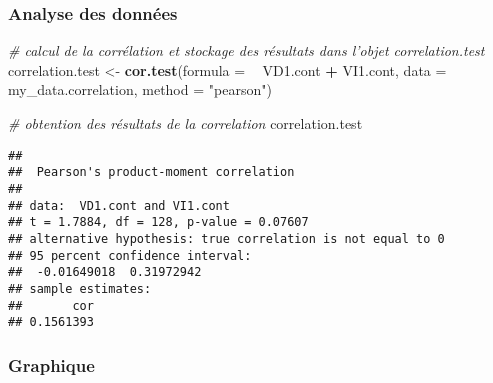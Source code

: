 \documentclass[
]{book}
\newenvironment{Shaded}{\begin{snugshade}}{\end{snugshade}}
\newcommand{\CommentTok}[1]{\textcolor[rgb]{0.56,0.35,0.01}{\textit{#1}}}
\newcommand{\DataTypeTok}[1]{\textcolor[rgb]{0.13,0.29,0.53}{#1}}
\newcommand{\KeywordTok}[1]{\textcolor[rgb]{0.13,0.29,0.53}{\textbf{#1}}}
\newcommand{\NormalTok}[1]{#1}
\newcommand{\OperatorTok}[1]{\textcolor[rgb]{0.81,0.36,0.00}{\textbf{#1}}}
\newcommand{\StringTok}[1]{\textcolor[rgb]{0.31,0.60,0.02}{#1}}
\begin{document}
\hypertarget{analyse-des-donnuxe9es-2}{%
\subsubsection{Analyse des données}\label{analyse-des-donnuxe9es-2}}

\begin{Shaded}
\begin{Highlighting}[]
\CommentTok{# calcul de la corrélation et stockage des résultats dans l’objet correlation.test}
\NormalTok{correlation.test <-}\StringTok{ }\KeywordTok{cor.test}\NormalTok{(}\DataTypeTok{formula =} \OperatorTok{~}\StringTok{ }\NormalTok{VD1.cont }\OperatorTok{+}\StringTok{ }\NormalTok{VI1.cont, }
                 \DataTypeTok{data =}\NormalTok{ my_data.correlation,}
                 \DataTypeTok{method =} \StringTok{"pearson"}\NormalTok{)}

\CommentTok{# obtention des résultats de la correlation }
\NormalTok{correlation.test}
\end{Highlighting}
\end{Shaded}

\begin{verbatim}
## 
## 	Pearson's product-moment correlation
## 
## data:  VD1.cont and VI1.cont
## t = 1.7884, df = 128, p-value = 0.07607
## alternative hypothesis: true correlation is not equal to 0
## 95 percent confidence interval:
##  -0.01649018  0.31972942
## sample estimates:
##       cor 
## 0.1561393
\end{verbatim}

\hypertarget{graphique-2}{%
\subsubsection{Graphique}\label{graphique-2}}
\end{document}
